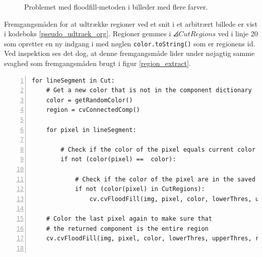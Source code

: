 {\begin{figure}[p]
    \setlength\fboxsep{0pt}
    \setlength\fboxrule{0.5pt}
    \centering
    \caption[]{Problemet med floodfill-metoden i billeder med flere
    farver.}
    \label{floodfill_taerskel_problem}
\end{figure}

Fremgangsmåden for at udtrække regioner ved et snit i et arbitrært
billede er vist i kodeboks \ref{pseudo_udtraek_org}. Regioner gemmes i
$\angles{CutRegions}$ ved i linje 20 som opretter en ny indgang i med
nøglen \texttt{color.toString()} som er regionens id. Ved inspektion ses
det dog, at denne fremgangsmåde lider under nøjagtig samme svaghed som
fremgangsmåden brugt i figur \ref{region_extract}.

\begin{lstlisting}[caption={Original pseudokode til udtrækning af
    regioner. Denne kan returnere den samme region flere
    gange.},captionpos=b,label={pseudo_udtraek_org},numbers=left,
    frame=single, breaklines=false, float=h]
for lineSegment in Cut:
    # Get a new color that is not in the component dictionary
    color = getRandomColor()
    region = cvConnectedComp()

    for pixel in lineSegment:

        # Check if the color of the pixel equals current color
        if not (color(pixel) ==  color):

            # Check if the color of the pixel are in the saved regions
            if not (color(pixel) in CutRegions):
                cv.cvFloodFill(img, pixel, color, lowerThres, upperThres, region)

    # Color the last pixel again to make sure that
    # the returned component is the entire region
    cv.cvFloodFill(img, pixel, color, lowerThres, upperThres, region)


\end{lstlisting}}
